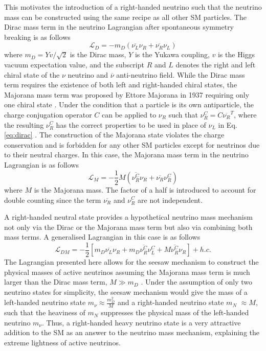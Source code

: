 This motivates the introduction of a right-handed neutrino such that the neutrino mass can be constructed using the same recipe as all other SM particles.
The Dirac mass term in the neutrino Lagrangian after spontaneous symmetry breaking is as follows \cite{Thomson}
\begin{equation}
\mathcal{L}_{D} = -m_{D} (\overline{\nu_{L}}\nu_{R} + \overline{\nu_{R}}\nu_{L}) 
\label{eq:dirac}
\end{equation}
where $m_{D} = Yv/\sqrt{2}$ is the Dirac mass, $Y$ is the Yukawa coupling, $v$ is the Higgs vacuum expectation value, and the subscript $R$ and $L$ denotes the right and left chiral state of the $\nu$ neutrino and $\overline{\nu}$ anti-neutrino field. 
While the Dirac mass term requires the existence of both left and right-handed chiral states, the Majorana mass term was proposed by Ettore Majorana in 1937 requiring only one chiral state \cite{Majorana}.
Under the condition that a particle is its own antiparticle, the charge conjugation operator $C$ can be applied to $\nu_R$ such that $\nu^{C}_{R}=C\overline{\nu_{R}}^{T}$, where the resulting $\nu_R^C$ has the correct properties to be used in place of $\nu_L$ in Eq. \ref{eq:dirac} \cite{Kim}.
The construction of the Majorana state violates the charge conservation and is forbidden for any other SM particles except for neutrinos due to their neutral charges. 
In this case, the Majorana mass term in the neutrino Lagrangian is as follows \cite{Kim}
\begin{equation}
	\mathcal{L}_{M} = -\frac{1}{2}M(\overline{\nu_{R}^{C}}\nu_{R} + \overline{\nu_{R}}\nu_{R}^{C})
\end{equation}
where $M$ is the Majorana mass. 
The factor of a half is introduced to account for double counting since the term $\overline{\nu_R}$ and $\nu^C_R$ are not independent.

A right-handed neutral state provides a hypothetical neutrino mass mechanism not only via the Dirac or the Majorana mass term but also via combining both mass terms.
A generalised Lagrangian in this case is as follows \cite{Thomson}
\begin{equation}
        \mathcal{L}_{DM} = -\frac{1}{2}[m_D\overline{\nu_{L}}\nu_{R} + m_D\overline{\nu_{R}^{C}}\nu_{L}^C + M\overline{\nu_{R}^{C}}\nu_{R}] + h.c.
\end{equation}
The Lagrangian presented here allows for the seesaw mechanism to construct the physical masses of active neutrinos assuming the Majorana mass term is much larger than the Dirac mass term, $M \gg m_D$ \cite{Thomson, nuMass}.
Under the assumption of only two neutrino states for simplicity, the seesaw mechanism would give the mass of a left-handed neutrino state $m_{\nu} \approx \frac{m_D^2}{M}$ and a right-handed neutrino state $m_N$ $\approx M$, such that the heaviness of $m_N$ suppresses the physical mass of the left-handed neutrino $m_\nu$.
Thus, a right-handed heavy neutrino state is a very attractive addition to the SM as an answer to the neutrino mass mechanism, explaining the extreme lightness of active neutrinos.

